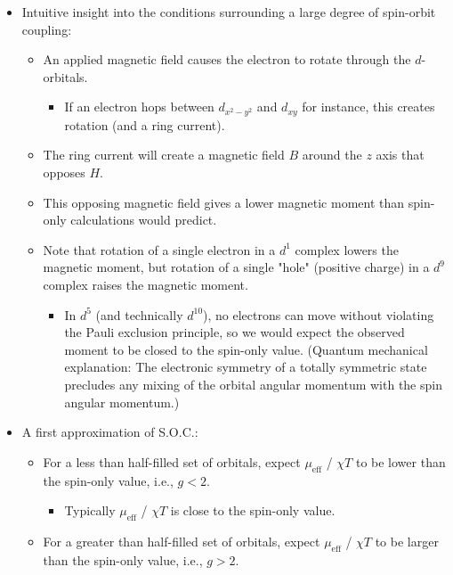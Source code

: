 \documentclass[../notes.tex]{subfiles}
\begin{document}
\begin{itemize}
    \item Intuitive insight into the conditions surrounding a large degree of spin-orbit coupling:
    \begin{itemize}
        \item An applied magnetic field causes the electron to rotate through the $d$-orbitals.
        \begin{itemize}
            \item If an electron hops between $d_{x^2-y^2}$ and $d_{xy}$ for instance, this creates rotation (and a ring current).
        \end{itemize}
        \item The ring current will create a magnetic field $B$ around the $z$ axis that opposes $H$.
        \item This opposing magnetic field gives a lower magnetic moment than spin-only calculations would predict.
        \item Note that rotation of a single electron in a $d^1$ complex lowers the magnetic moment, but rotation of a single "hole" (positive charge) in a $d^9$ complex raises the magnetic moment.
        \begin{itemize}
            \item In $d^5$ (and technically $d^{10}$), no electrons can move without violating the Pauli exclusion principle, so we would expect the observed moment to be closed to the spin-only value. (Quantum mechanical explanation: The electronic symmetry of a totally symmetric state precludes any mixing of the orbital angular momentum with the spin angular momentum.)
        \end{itemize}
    \end{itemize}
    \item A first approximation of S.O.C.:
    \begin{itemize}
        \item For a less than half-filled set of orbitals, expect $\mu_\text{eff}$ / $\chi T$ to be lower than the spin-only value, i.e., $g<2$.
        \begin{itemize}
            \item Typically $\mu_\text{eff}$ / $\chi T$ is close to the spin-only value.
        \end{itemize}
        \item For a greater than half-filled set of orbitals, expect $\mu_\text{eff}$ / $\chi T$ to be larger than the spin-only value, i.e., $g>2$.
        \begin{itemize}

\end{itemize}
\end{itemize}
\end{itemize}
\end{document}
